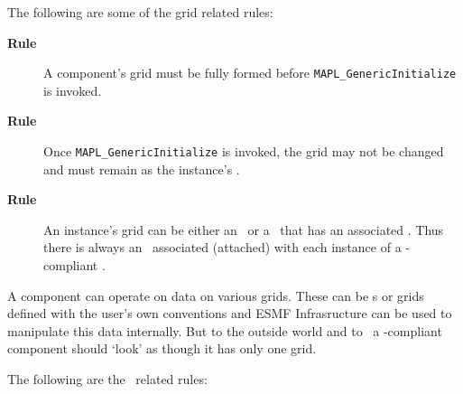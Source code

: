 The following are some of the grid related rules:
%
\begin{description}
\item[{\bf Rule \thegenct}] A component's grid must be fully formed 
  before {\tt MAPL\_GenericInitialize} is invoked.
  \addtocounter{genct}{1}

\item[{\bf Rule \thegenct}] Once {\tt MAPL\_GenericInitialize} is invoked, 
  the grid may not be changed and must remain as the instance's \grd.
  \addtocounter{genct}{1}

\item[{\bf Rule \thegenct}] An instance's grid can be either an \grd\ or a
  \loc\ that has an associated \grd. Thus there is always an \grd\
  associated (attached) with each instance of a \ggn-compliant \egc.
  \addtocounter{genct}{1}
\end{description}

A component can operate on
data on various grids. These can be \grd s or grids defined with the
user's own conventions and ESMF Infrasructure can be used to
manipulate this data internally. But to the outside world and to \ggn\ 
a \ggn-compliant component should `look' as though it has only one grid.

The following are the \stt\ related rules:

